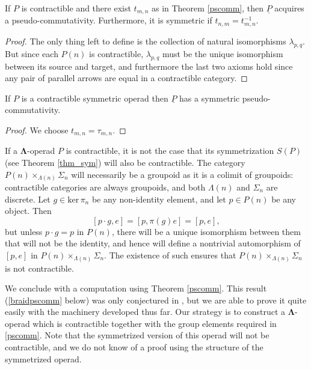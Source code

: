 \documentclass{amsbook} %
\newcommand{\ML}{\mathbf{\Lambda}}
\numberwithin{section}{chapter}
\begin{document}
\begin{cor}
If $P$ is contractible and there exist $t_{m,n}$ as in Theorem \ref{pscomm}, then $\underline{P}$ acquires a pseudo-commutativity. Furthermore, it is symmetric if $t_{n,m} = t_{m,n}^{-1}$.
\end{cor}
\begin{proof}
The only thing left to define is the collection of natural isomorphisms $\lambda_{p,q}$.  But since each $P(n)$ is contractible, $\lambda_{p,q}$ must be the unique isomorphism between its source and target, and furthermore the last two axioms hold since any pair of parallel arrows are equal in a contractible category.
\end{proof}

\begin{cor}
If $P$ is a contractible symmetric operad then $\underline{P}$ has a symmetric pseudo-commutativity.
\end{cor}
\begin{proof}
We choose $t_{m,n} = \tau_{m,n}$.
\end{proof}

\begin{rem}
If a $\ML$-operad $P$ is contractible, it is not the case that its symmetrization $S(P)$ (see Theorem \ref{thm_sym}) will also be contractible.  The category $P(n) \times_{\Lambda(n)} \Sigma_{n}$ will necessarily be a groupoid as it is a colimit of groupoids: contractible categories are always groupoids, and both $\Lambda(n)$ and $\Sigma_{n}$ are discrete.  Let $g \in \textrm{ker} \, \pi_{n}$ be any non-identity element, and let $p \in P(n)$ be any object.  Then
  \[
    [p \cdot g, e] = [p, \pi(g)e] = [p,e],
  \]
but unless $p\cdot g = p$ in $P(n)$, there will be a unique isomorphism between them that will not be the identity, and hence will define a nontrivial automorphism of $[p,e]$ in  $P(n) \times_{\Lambda(n)} \Sigma_{n}$.  The existence of such ensures that $P(n) \times_{\Lambda(n)} \Sigma_{n}$ is not contractible.
\end{rem}



We conclude with a computation using Theorem \ref{pscomm}.  This result (\ref{braidpscomm} below) was only conjectured in \cite{HP}, but we are able to prove it quite easily with the machinery developed thus far.  Our strategy is to construct a $\ML$-operad which is contractible together with the group elements required in \ref{pscomm}.  Note that the symmetrized version of this operad will not be contractible, and we do not know of a proof using the structure of the symmetrized operad.
\end{document}
